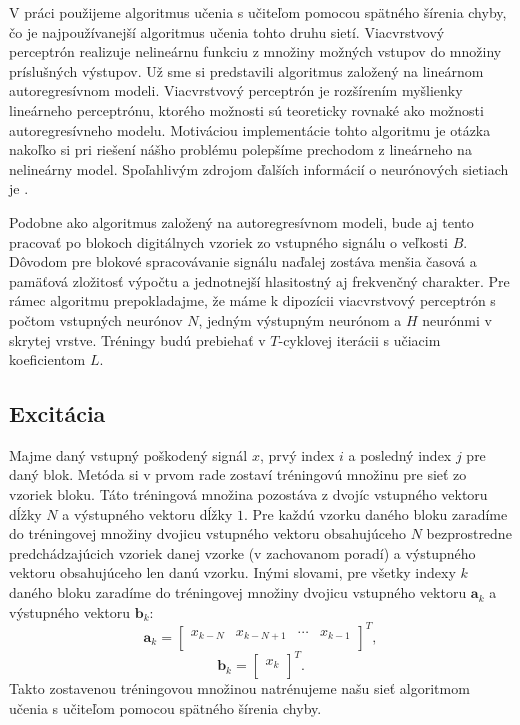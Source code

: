 V práci použijeme algoritmus učenia s učiteľom pomocou spätného šírenia chyby, čo je najpoužívanejší algoritmus učenia tohto druhu sietí. Viacvrstvový perceptrón realizuje nelineárnu funkciu z množiny možných vstupov do množiny príslušných výstupov. Už sme si predstavili algoritmus založený na lineárnom autoregresívnom modeli. Viacvrstvový perceptrón je rozšírením myšlienky lineárneho perceptrónu, ktorého možnosti sú teoreticky rovnaké ako možnosti autoregresívneho modelu. Motiváciou implementácie tohto algoritmu je otázka nakoľko si pri riešení nášho problému polepšíme prechodom z lineárneho na nelineárny model. Spoľahlivým zdrojom ďalších informácií o neurónových sietiach je \cite{Sima}. 

Podobne ako algoritmus založený na autoregresívnom modeli, bude aj tento pracovať po blokoch digitálnych vzoriek zo vstupného signálu o veľkosti $B$. Dôvodom pre blokové spracovávanie signálu naďalej zostáva menšia časová a pamäťová zložitosť výpočtu a jednotnejší hlasitostný aj frekvenčný charakter. Pre rámec algoritmu prepokladajme, že máme k dipozícii viacvrstvový perceptrón s počtom vstupných neurónov $N$, jedným výstupným neurónom a $H$ neurónmi v skrytej vrstve. Tréningy budú prebiehať v $T$-cyklovej iterácii s učiacim koeficientom $L$.

\subsection{Excitácia}
Majme daný vstupný poškodený signál $x$, prvý index $i$ a posledný index $j$ pre daný blok. Metóda si v prvom rade zostaví tréningovú množinu pre sieť zo vzoriek bloku. Táto tréningová množina pozostáva z dvojíc vstupného vektoru dĺžky $N$ a výstupného vektoru dĺžky $1$. Pre každú vzorku daného bloku zaradíme do tréningovej množiny dvojicu vstupného vektoru obsahujúceho $N$ bezprostredne predchádzajúcich vzoriek danej vzorke (v zachovanom poradí) a výstupného vektoru obsahujúceho len danú vzorku. Inými slovami, pre všetky indexy $k$ daného bloku zaradíme do tréningovej množiny dvojicu vstupného vektoru $\mathbf{a}_k$ a výstupného vektoru $\mathbf{b}_k$:
$$\mathbf{a}_k=\begin{bmatrix} 
x_{k-N} & x_{k-N+1} & \cdots & x_{k-1}\\
\end{bmatrix}^T,$$
$$\mathbf{b}_k=\begin{bmatrix} 
x_k\\ 
\end{bmatrix}^T.$$
Takto zostavenou tréningovou množinou natrénujeme našu sieť algoritmom učenia s učiteľom pomocou spätného šírenia chyby. 

